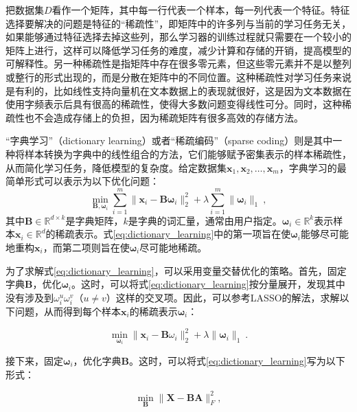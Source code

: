 把数据集$D$看作一个矩阵，其中每一行代表一个样本，每一列代表一个特征。特征选择要解决的问题是特征的“稀疏性”，即矩阵中的许多列与当前的学习任务无关，如果能够通过特征选择去掉这些列，那么学习器的训练过程就只需要在一个较小的矩阵上进行，这样可以降低学习任务的难度，减少计算和存储的开销，提高模型的可解释性。另一种稀疏性是指矩阵中存在很多零元素，但这些零元素并不是以整列或整行的形式出现的，而是分散在矩阵中的不同位置。这种稀疏性对学习任务来说是有利的，比如线性支持向量机在文本数据上的表现就很好，这是因为文本数据在使用字频表示后具有很高的稀疏性，使得大多数问题变得线性可分。同时，这种稀疏性也不会造成存储上的负担，因为稀疏矩阵有很多高效的存储方法。

“字典学习”（dictionary learning）或者“稀疏编码”（sparse coding）则是其中一种将样本转换为字典中的线性组合的方法，它们能够赋予密集表示的样本稀疏性，从而简化学习任务，降低模型的复杂度。给定数据集$\boldsymbol{x}_1, \boldsymbol{x}_2, \ldots, \boldsymbol{x}_m$，字典学习的最简单形式可以表示为以下优化问题：
\begin{equation}
\min_{\mathbf{B},\boldsymbol{\omega}_i}\sum_{i=1}^m\|\boldsymbol{x}_i-\mathbf{B}\boldsymbol{\omega}_i\|_2^2+\lambda\sum_{i=1}^m\|\boldsymbol{\omega}_i\|_1\:,
\label{eq:dictionary_learning}
\end{equation}
其中$\mathbf{B} \in \mathbb{R}^{d \times k}$是字典矩阵，$k$是字典的词汇量，通常由用户指定。$\boldsymbol{\omega}_i \in \mathbb{R}^k$表示样本$\boldsymbol{x}_i \in \mathbb{R}^d$的稀疏表示。式\ref{eq:dictionary_learning}中的第一项旨在使$\boldsymbol{\omega}_i$能够尽可能地重构$\boldsymbol{x}_i$，而第二项则旨在使$\boldsymbol{\omega}_i$尽可能地稀疏。

为了求解式\ref{eq:dictionary_learning}，可以采用变量交替优化的策略。首先，固定字典$\mathbf{B}$，优化$\boldsymbol{\omega}_i$。这时，可以将式\ref{eq:dictionary_learning}按分量展开，发现其中没有涉及到$\omega_i^u \omega_i^v$（$u \neq v$）这样的交叉项。因此，可以参考LASSO的解法，求解以下问题，从而得到每个样本$\boldsymbol{x}_i$的稀疏表示$\boldsymbol{\omega}_i$：

\begin{equation}
\min_{\boldsymbol{\omega}_i}\|\boldsymbol{x}_i-\mathbf{B}\omega_i\|_2^2+\lambda\|\boldsymbol{\omega}_i\|_1\:.
\label{eq:dictionary_learning_3}
\end{equation}

接下来，固定$\boldsymbol{\omega}_i$，优化字典$\mathbf{B}$。这时，可以将式\ref{eq:dictionary_learning}写为以下形式：

\begin{equation}
\min_{\mathbf{B}}\|\mathbf{X}-\mathbf{BA}\|_{F}^{2},
\label{eq:dictionary_learning_4}
\end{equation}

